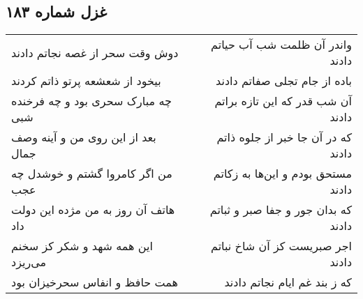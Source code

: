 \begin{center}
\section*{غزل شماره ۱۸۳}
\label{sec:sh183}
\begin{longtable}{l p{0.5cm} r}
دوش وقت سحر از غصه نجاتم دادند
&&
واندر آن ظلمت شب آب حیاتم دادند
\\
بیخود از شعشعه پرتو ذاتم کردند
&&
باده از جام تجلی صفاتم دادند
\\
چه مبارک سحری بود و چه فرخنده شبی
&&
آن شب قدر که این تازه براتم دادند
\\
بعد از این روی من و آینه وصف جمال
&&
که در آن جا خبر از جلوه ذاتم دادند
\\
من اگر کامروا گشتم و خوشدل چه عجب
&&
مستحق بودم و این‌ها به زکاتم دادند
\\
هاتف آن روز به من مژده این دولت داد
&&
که بدان جور و جفا صبر و ثباتم دادند
\\
این همه شهد و شکر کز سخنم می‌ریزد
&&
اجر صبریست کز آن شاخ نباتم دادند
\\
همت حافظ و انفاس سحرخیزان بود
&&
که ز بند غم ایام نجاتم دادند
\\
\end{longtable}
\end{center}
